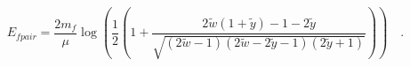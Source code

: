 \begin{equation}
E_{fpair}=\frac{2m_f}{\mu}\log\left(\frac{1}{2}\left(1+\frac{2\tilde{w}(1+\tilde{y})-1-2\tilde{y}}{\sqrt{(2\tilde{w}-1)(2\tilde{w}-2\tilde{y}-1)(2\tilde{y}+1)}}\right)\right)\quad.
\end{equation}

